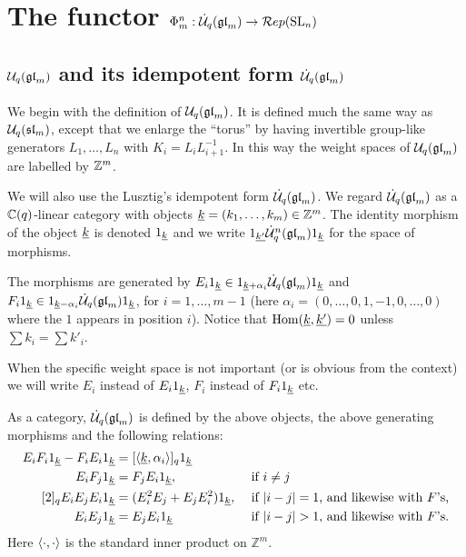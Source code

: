 \documentclass[11pt,leqno]{article}
\begin{document}
\section{The functor $\Phi_m^n:\dot{{\mathcal{U}}}_q({\mathfrak{gl}}_m) \rightarrow \mathcal{R}ep({\rm{SL}}_n)$}\label{sec:phi}

\subsection{$ \mathcal{U}_q({\mathfrak{gl}}_m)$ and its idempotent form $\dot{{\mathcal{U}}}_q({\mathfrak{gl}}_m)$}\label{sec:idemform}
We begin with the definition of $ \mathcal{U}_q({\mathfrak{gl}}_m)$.  It is defined much the same way as $ \mathcal{U}_q({\mathfrak{sl}}_m) $, except that we enlarge the ``torus'' by having invertible group-like generators $ L_1, \dots, L_n $ with $ K_i = L_i L_{i+1}^{-1} $.  In this way the weight spaces of $ \mathcal{U}_q({\mathfrak{gl}}_m) $ are labelled by $ {\mathbb{Z}}^m $.

We will also use the Lusztig's idempotent form $ \dot{{\mathcal{U}}}_q({\mathfrak{gl}}_m) $.
We regard $\dot{{\mathcal{U}}}_q({\mathfrak{gl}}_m)$ as a ${\mathbb{C}}(q)$-linear category with objects $ {\underline{k}} = (k_1, \dots, k_m) \in \mathbb Z^m $.  The identity morphism of the object ${\underline{k}}$ is denoted $1_{\underline{k}}$  and we write $ 1_{\underline{k'}} \dot{{\mathcal{U}}}_q^n({\mathfrak{gl}}_m) 1_{\underline{k}}$ for the space of morphisms.

The morphisms are generated by $E_i 1_{{\underline{k}}} \in 1_{{\underline{k}} + \alpha_i} \dot{{\mathcal{U}}}_q({\mathfrak{gl}}_m) 1_{{\underline{k}}} $ and $ F_i 1_{{\underline{k}}} \in 1_{{\underline{k}} - \alpha_i} \dot{{\mathcal{U}}}_q({\mathfrak{gl}}_m) 1_{{\underline{k}}}$, for $i=1, \dots, m-1$ (here $\alpha_i = (0,\dots,0,1,-1,0,\dots,0)$ where the $1$ appears in position $i$).  Notice that $\operatorname{Hom}({\underline{k}}, {\underline{k'}}) = 0 $ unless $\sum k_i = \sum k'_i$.

\begin{rem} When the specific weight space is not important (or is obvious from the context) we will write $E_i$ instead of $E_i 1_{{\underline{k}}}$, $F_i$ instead of $F_i 1_{{\underline{k}}}$ etc.
\end{rem}

As a category, $\dot{{\mathcal{U}}}_q({\mathfrak{gl}}_m)$ is defined by the above objects, the above generating morphisms and the following relations:
\begin{align}
\label{rel:1} E_i F_i 1_{{\underline{k}}} - F_i E_i 1_{{\underline{k}}} &= [\langle {\underline{k}}, \alpha_i \rangle]_q 1_{{\underline{k}}} & &\\
\label{rel:2}  E_iF_j 1_{{\underline{k}}} &= F_jE_i 1_{{\underline{k}}}, & & \text{ if $i \ne j$} \\
\label{rel:3} [2]_q E_iE_jE_i 1_{{\underline{k}}} &= (E_i^2 E_j + E_j E_i^2) 1_{{\underline{k}}}, && \text{ if $ |i - j| = 1 $, and likewise with $F$'s,} \\
\label{rel:4} E_iE_j 1_{{\underline{k}}} &= E_jE_i 1_{{\underline{k}}} &&\text{ if $ |i -j| > 1$, and likewise with $F$'s.}
\end{align}
Here $\langle \cdot, \cdot \rangle$ is the standard inner product on $\mathbb Z^m$.
\end{document}
